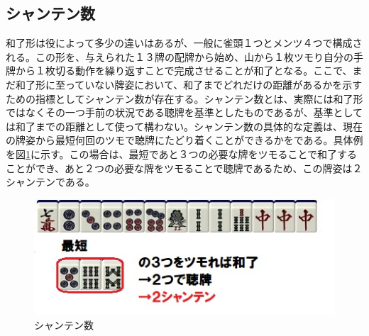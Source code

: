 \subsection{シャンテン数}
和了形は役によって多少の違いはあるが、一般に雀頭１つとメンツ４つで構成される。この形を、与えられた１３牌の配牌から始め、山から１枚ツモり自分の手牌から１枚切る動作を繰り返すことで完成させることが和了となる。ここで、まだ和了形に至っていない牌姿において、和了までどれだけの距離があるかを示すための指標としてシャンテン数が存在する。シャンテン数とは、実際には和了形ではなくその一つ手前の状況である聴牌を基準としたものであるが、基準としては和了までの距離として使って構わない。シャンテン数の具体的な定義は、現在の牌姿から最短何回のツモで聴牌にたどり着くことができるかをである。具体例を図\ref{2syanten}に示す。この場合は、最短であと３つの必要な牌をツモることで和了することができ、あと２つの必要な牌をツモることで聴牌であるため、この牌姿は２シャンテンである。

\begin{figure}[h]
 \centering
 \includegraphics[keepaspectratio, scale=1,bb=0 0 320 239]
      {img/2syanten.jpg}
 \caption{シャンテン数}
 \label{2syanten}
\end{figure}

